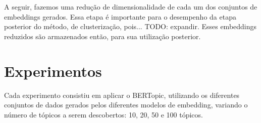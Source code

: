 A seguir, fazemos uma redução de dimensionalidade de cada um dos conjuntos de embeddings gerados. Essa etapa é importante para o desempenho da etapa posterior do método, de clusterização, pois... TODO: expandir. Esses embeddings reduzidos são armazenados então, para sua utilização posterior.

\section{Experimentos}
Cada experimento consistiu em aplicar o BERTopic, utilizando os diferentes conjuntos de dados gerados pelos diferentes modelos de embedding, variando o número de tópicos a serem descobertos: 10, 20, 50 e 100 tópicos.
